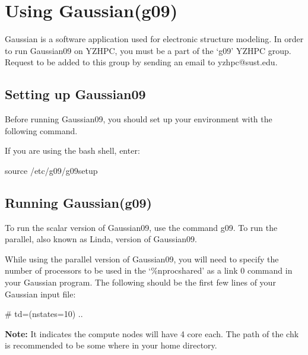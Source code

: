 \documentclass{book}
\begin{document}


\chapter{Using Gaussian(g09)}%
\label{cha:using_gaussian_g09_}

Gaussian is a software application used for electronic structure modeling. In order to run Gaussian09 on YZHPC, you must be a part of the ‘g09’ YZHPC group.  Request to be added to this group by sending an email to yzhpc@sust.edu.  

\section{Setting up Gaussian09}%
\label{sec:setting_up_gaussian09}

Before running Gaussian09, you should set up your environment with the following command.

If you are using the bash shell, enter:

\begin{myverbatim}
	source /etc/g09/g09setup
\end{myverbatim}

\section{Running Gaussian(g09)}%
\label{sec:running_gaussian_g09_}

To run the scalar version of Gaussian09, use the command g09. To run the parallel, also known as Linda, version of Gaussian09.

While using the parallel version of Gaussian09, you will need to specify the number of processors to be used in the ‘\%nprocshared’ as a link 0 command in your Gaussian program. The following should be the first few lines of your Gaussian input file:

\begin{myverbatim}
	# td=(nstates=10) ..
\end{myverbatim}

\textbf{Note:} It indicates the compute nodes will have 4 core each. The path of the chk is recommended to be some where in your home directory.
\end{document}
